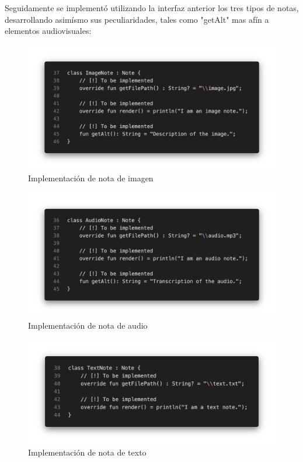 \documentclass{article}
\begin{document}
        Seguidamente se implementó utilizando la interfaz anterior los tres tipos de notas,
         desarrollando asimísmo sus peculiaridades, tales como "getAlt" mas afín a elementos
         audiovisuales:

        \begin{figure}[H]
            \centerline{\includegraphics[scale=0.3]{image_note.png}}
            \caption{Implementación de nota de imagen}
            \label{fig:image_note}
        \end{figure}

        \begin{figure}[H]
            \centerline{\includegraphics[scale=0.3]{audio_note.png}}
            \caption{Implementación de nota de audio}
            \label{fig:audio_note}
        \end{figure}

        \begin{figure}[H]
            \centerline{\includegraphics[scale=0.3]{text_note.png}}
            \caption{Implementación de nota de texto}
            \label{fig:text_note}
        \end{figure}
\end{document}
